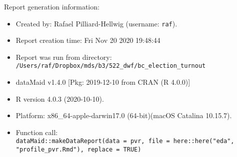 \documentclass[
]{report}
\begin{document}
\noindent\makebox[\linewidth]{\rule{\textwidth}{0.4pt}}

Report generation information:

\begin{itemize}
\item
  Created by: Rafael Pilliard-Hellwig (username: \texttt{raf}).
\item
  Report creation time: Fri Nov 20 2020 19:48:44
\item
  Report was run from directory:
  \texttt{/Users/raf/Dropbox/mds/b3/522\_dwf/bc\_election\_turnout}
\item
  dataMaid v1.4.0 {[}Pkg: 2019-12-10 from CRAN (R 4.0.0){]}
\item
  R version 4.0.3 (2020-10-10).
\item
  Platform: x86\_64-apple-darwin17.0 (64-bit)(macOS Catalina 10.15.7).
\item
  Function call:
  \texttt{dataMaid::makeDataReport(data\ =\ pvr,\ file\ =\ here::here("eda",\ \ \ \ \ \ "profile\_pvr.Rmd"),\ replace\ =\ TRUE)}
\end{itemize}
\end{document}
